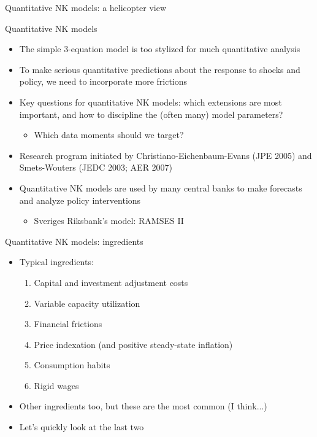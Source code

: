 \documentclass[9pt,xcolor={dvipsnames}]{beamer}
\newcommand{\bit}{\begin{itemize}}
\newcommand{\eit}{\end{itemize}}
\newcommand{\ben}{\begin{enumerate}}
\newcommand{\een}{\end{enumerate}}
\begin{document}
\begin{frame}

\begin{center}
	\huge Quantitative NK models: a helicopter view \normalfont
\end{center}

\end{frame}


\begin{frame}{Quantitative NK models}

\bit
\setlength\itemsep{1.5em}
\item The simple 3-equation model is too stylized for much quantitative analysis

\item To make serious quantitative predictions about the response to shocks and policy, we need to incorporate more frictions

\item Key questions for quantitative NK models: which extensions are most important, and how to discipline the (often many) model parameters? 
\bit
	\item Which data moments should we target?
\eit

\item Research program initiated by Christiano-Eichenbaum-Evans (JPE 2005) and Smets-Wouters (JEDC 2003; AER 2007)

\item Quantitative NK models are used by many central banks to make forecasts and analyze policy interventions
\bit
	\item Sveriges Riksbank's model: RAMSES II
\eit


\eit

\end{frame}

\begin{frame}{Quantitative NK models: ingredients}
\bit
\setlength\itemsep{1.5em}

\item Typical ingredients:
\ben
\setlength\itemsep{0.5em}
\item Capital and investment adjustment costs

\item Variable capacity utilization

\item Financial frictions

\item Price indexation (and positive steady-state inflation)

\item Consumption habits

\item Rigid wages
\een

\item Other ingredients too, but these are the most common (I think...)

\item Let's quickly look at the last two
\eit

\end{frame}
\end{document}
